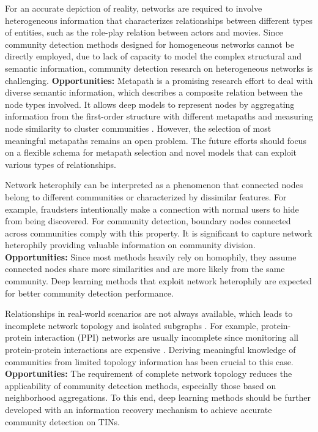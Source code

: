 For an accurate depiction of reality, networks are required to involve heterogeneous information  that characterizes relationships between different types of entities, such as the role-play relation between actors and movies. Since community detection methods designed for homogeneous networks cannot be directly employed, due to lack of capacity to model the complex structural and semantic information, community detection research on heterogeneous networks is challenging. 
\vspace{2mm}
\noindent
\textbf{Opportunities:} Metapath is a promising research effort to deal with diverse semantic information, which describes a composite relation between the node types involved. It allows deep models to represent nodes by aggregating information from the first-order structure with different metapaths and measuring node similarity to cluster communities . However, the selection of most meaningful metapaths remains an open problem. The future efforts should focus on a flexible schema for metapath selection and novel models that can exploit various types of relationships.

Network heterophily  can be interpreted as a phenomenon that connected nodes belong to different communities or characterized by dissimilar features. For example, fraudsters intentionally make a connection with normal users to hide from being discovered. For community detection, boundary nodes connected across communities comply with this property. It is significant to capture network heterophily providing valuable information on community division.
\vspace{2mm}
\noindent
\textbf{Opportunities:} Since most methods heavily rely on homophily, they assume connected nodes share more similarities and are more likely from the same community. Deep learning methods that exploit network heterophily are expected for better community detection performance.

Relationships in real-world scenarios are not always available, which leads to incomplete network topology and isolated subgraphs . For example, protein-protein interaction (PPI) networks are usually incomplete since monitoring all protein-protein interactions are expensive . Deriving meaningful knowledge of communities from limited topology information has been crucial to this case.
\vspace{2mm}
\noindent
\textbf{Opportunities:} The requirement of complete network topology reduces the applicability of community detection methods, especially those based on neighborhood aggregations. To this end, deep learning methods should be further developed with an information recovery mechanism to achieve accurate community detection on TINs.

